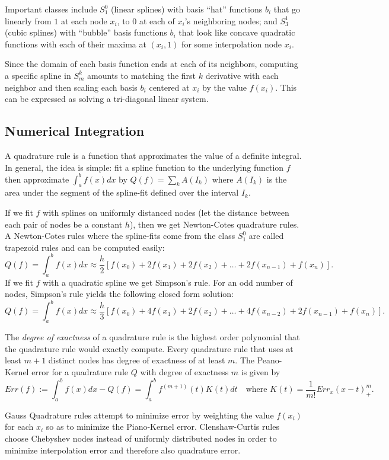 \documentclass[12pt]{article}
\begin{document}
Important classes include $S_1^0$ (linear splines) with basis ``hat''
functions $b_i$ that go linearly from $1$ at each node $x_i$, to $0$ at 
each of $x_i$'s neighboring nodes; and
$S_3^1$ (cubic splines) with ``bubble'' basis functions $b_i$ that look
like concave quadratic functions with each of their maxima at $(x_i,1)$
for some interpolation node $x_i$.

Since the domain of each basis function ends at each of its neighbors,
computing a specific spline in $S^k_m$ amounts to matching the first
$k$ derivative with each neighbor and then scaling each basis $b_i$ centered
at $x_i$ by the value $f(x_i)$.
This can be expressed as solving a tri-diagonal linear system.

\subsection*{Numerical Integration}

A quadrature rule is a function that approximates the value of a definite
integral.
In general, the idea is simple:
fit a spline function to the underlying function $f$ then approximate
$\int_{a}^b f(x) dx$ by $Q(f) = \sum_k A(I_k)$ where $A(I_k)$ is the
area under the segment of the spline-fit defined over the interval
$I_k$.

If we fit $f$ with splines on uniformly distanced nodes (let the
distance between each pair of nodes be a constant $h$), then
we get Newton-Cotes quadrature rules.
A Newton-Cotes rules where the spline-fits come from the class $S_1^0$
are called trapezoid rules and can be computed easily:
$$
Q(f) = \int_a^b f(x) dx \approx \frac{h}{2}[f(x_0) + 2f(x_1) + 2f(x_2) 
+ \ldots + 2f(x_{n-1}) + f(x_n)].
$$
If we fit $f$ with a quadratic spline we get Simpson's rule.
For an odd number of nodes, Simpson's rule yields the following
closed form solution:
$$
Q(f) = \int_a^b f(x) dx \approx \frac{h}{3}[f(x_0) + 4f(x_1) + 2f(x_2) 
+ \ldots + 4f(x_{n-2}) + 2f(x_{n-1}) + f(x_n)].
$$

The {\it degree of exactness} of a quadrature rule is the highest
order polynomial that the quadrature rule would exactly compute.
Every quadrature rule that uses at least $m+1$ distinct nodes
has degree of exactness of at least $m$.
The Peano-Kernel error for a quadrature rule $Q$ with degree of
exactness $m$ is given by
$$
Err(f) := \int_a^b f(x) dx - Q(f) = \int_a^b f^{(m+1)}(t) K(t) dt 
\quad\text{where $K(t) = \frac{1}{m!}Err_x (x-t)^m_+$.}
$$

Gauss Quadrature rules attempt to minimize error by weighting the
value $f(x_i)$ for each $x_i$ so as to minimize the Piano-Kernel
error.
Clenshaw-Curtis rules choose Chebyshev nodes instead of uniformly
distributed nodes in order to minimize interpolation error
and therefore also quadrature error.
\end{document}
